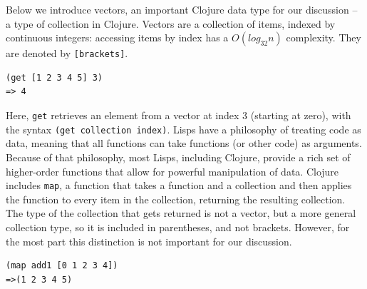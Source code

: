 \documentclass[12pt]{article}
\newcommand{\comment}[1]{{\bf \tt  {#1}}}
\newcommand{\emcomment}[1]{\textcolor{ForestGreen}{\comment{Elena: {#1}}}}
\newcommand{\clocode}[1]{{\texttt {#1}}}
\begin{document}
Below we introduce vectors, an important Clojure data type for our discussion -- a type of collection in Clojure. Vectors are a collection of items, indexed by continuous integers: accessing items by index has a $O(log_{32}n)$  complexity. They are denoted by 
\clocode{[brackets]}.
\begin{verbatim}
(get [1 2 3 4 5] 3)
=> 4
\end{verbatim}
Here, \clocode{get} retrieves an element from a vector at index 3 (starting at zero), with the syntax \clocode{(get collection index)}.
Lisps have a philosophy of treating code as data, meaning that all functions can take functions (or other code) as arguments. Because of that philosophy, most Lisps, including Clojure, provide a rich set of higher-order functions that allow for powerful manipulation of data. Clojure includes \clocode{map}, a function that takes a function and a collection and then applies the function to every item in the collection, returning the resulting collection. The type of the collection that gets returned is not a vector, but a more general collection type, so it is included in parentheses, and not brackets. However, for the most part this distinction is not important for our discussion. 
\begin{verbatim}
(map add1 [0 1 2 3 4])
=>(1 2 3 4 5)
\end{verbatim}
\end{document}
